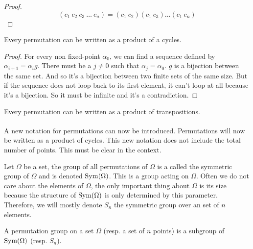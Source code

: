 \begin{proof}
  \[
    (c_1\ c_2\ c_3\ \dots\ c_n) = (c_1\ c_2)(c_1\ c_3)\dots(c_1\ c_n)
  \]
\end{proof}

\begin{proposition}
  Every permutation can be written as a product of a cycles.
\end{proposition}

\begin{proof}
  For every non fixed-point $\alpha_0$, we can find a sequence defined by $\alpha_{i+1} = \alpha_i g$. There must be a $j \neq 0$ such that $\alpha_j = \alpha_0$. $g$ is a bijection between the same set. And so it's a bijection between two finite sets of the same size. But if the sequence does not loop back to its first element, it can't loop at all because it's a bijection. So it must be infinite and it's a contradiction.
\end{proof}

\begin{corollary}
  Every permutation can be written as a product of transpositions.
\end{corollary}

\paragraph{}
A new notation for permutations can now be introduced. Permutations will now be written as a product of cycles. This new notation does not include the total number of points. This must be clear in the context.

\begin{definition}
  Let $\Omega$ be a set, the group of all permutations of $\Omega$ is a called the symmetric group of $\Omega$ and is denoted $\operatorname{Sym}(\Omega)$. This is a group acting on $\Omega$. Often we do not care about the elements of $\Omega$, the only important thing about $\Omega$ is its size because the structure of $\operatorname{Sym}(\Omega)$ is only determined by this parameter. Therefore, we will mostly denote $S_n$ the symmetric group over an set of $n$ elements.
\end{definition}

\begin{definition}
  A permutation group on a set $\Omega$ (resp. a set of $n$ points) is a subgroup of $\operatorname{Sym}(\Omega)$ (resp. $S_n$).
\end{definition}

